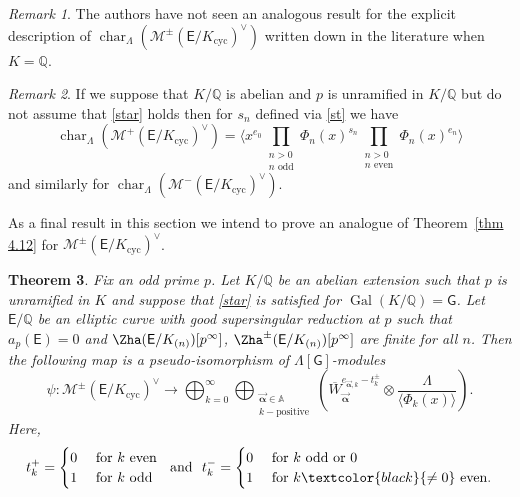 \documentclass{amsart}
\newcommand{\edit}[1]{\textcolor{black}{#1}}
\newtheorem{theorem}{Theorem}[section]
\numberwithin{equation}{section}
\theoremstyle{remark}
\newtheorem{remark}[theorem]{Remark}
\newcommand{\val}{\vec{\boldsymbol{\alpha}}}
\newcommand{\EC}{\mathsf{E}}
\newcommand{\cM}{\mathcal{M}}
\newcommand{\Gal}{\operatorname{Gal}}
\newcommand{\sG}{\mathsf{G}}
\newcommand{\A}{\mathbb{A}}
\newcommand{\Q}{\mathbb{Q}}
\newcommand{\cyc}{\operatorname{{cyc}}}
\newcommand{\charac}{\operatorname{char}}
\theoremstyle{plain} %
\begin{document}
\begin{remark}
The authors have not seen an analogous result for the explicit description of $\charac_{\Lambda}(\cM^{\pm}(\EC/K_{\cyc})^\vee)$ written down in the literature when $K=\Q$.
\end{remark}

\begin{remark}
If we suppose that $K/\Q$ is abelian and $p$ is unramified in $K/\Q$ but do not assume that \ref{star} holds then for $s_n$ defined via \eqref{st} we have
\[
\charac_{\Lambda}(\cM^{+}(\EC/K_{\cyc})^\vee)  = \Bigg\langle x^{e_0} \prod_{\substack{n>0\\ n \text{ odd}}} \Phi_n(x)^{s_n} \prod_{\substack{n>0\\ n \text{ even}}} \Phi_n(x)^{e_n} \Bigg\rangle
\]
and similarly for $\charac_{\Lambda}(\cM^{-}(\EC/K_{\cyc})^\vee)$.
\end{remark}

As a final result in this section we intend to prove an analogue of Theorem~\ref{thm 4.12} for $\cM^{\pm}(\EC/K_{\cyc})^\vee$.


\begin{theorem}
\label{thm 5 note of June 16}
Fix an odd prime $p$.
Let $K/\Q$ be an abelian extension such that $p$ is unramified in $K$ and suppose that \ref{star} is satisfied for $\Gal(K/\Q) = \mathsf{G}$.
Let $\EC/\Q$ be an elliptic curve with good \emph{supersingular} reduction at $p$ such that $a_p(\EC)=0$ and $\Zha(\EC/K_{(n)})[p^\infty]$, $\Zha^{\pm}(\EC/K_{(n)})[p^\infty]$ are finite for all $n$.
Then the following map is a pseudo-isomorphism of $\Lambda[\sG]$-modules
\[
\psi: \cM^{\pm}(\EC/K_{\cyc})^\vee \longrightarrow \bigoplus_{k=0}^\infty \bigoplus_{\substack{\val\in \A\\ k-\text{positive}}} \left( \overline{W}_{\val}^{e_{\val,k}-t^{\pm}_k} \otimes \frac{\Lambda}{\langle \Phi_k(x)\rangle} \right).
\]
Here, 
\[
t^{+}_k = \begin{cases}
    0 & \text{ for } k \text{ even}\\
    1 & \text{ for } k \text{ odd}    
\end{cases} \ \text{ and } \  t^{-}_k = \begin{cases}
    0 & \text{ for } k \text{ odd or }0\\
    1 & \text{ for } k\edit{\neq 0} \text{ even}.
\end{cases}
\]
\end{theorem}
\end{document}
